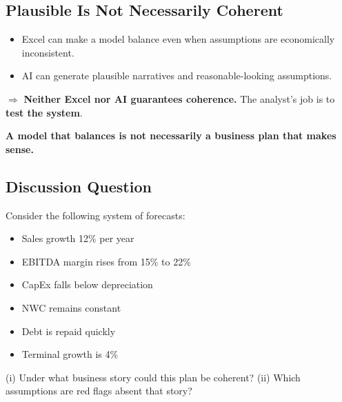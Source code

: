 \subsection{Plausible Is Not Necessarily Coherent}

\begin{itemize}
  \item Excel can make a model balance even when assumptions are economically inconsistent.
  \item AI can generate plausible narratives and reasonable-looking assumptions.
\end{itemize}
$\Longrightarrow$ \textbf{Neither Excel nor AI guarantees coherence.} The analyst's job is to \textbf{test the system}.
\begin{keybox}
\textbf{A model that balances is not necessarily a business plan that makes sense.}
\end{keybox}

\subsection[Discussion Question]{Discussion Question }

\begin{exbox}
Consider the following system of forecasts:
\begin{itemize}
  \item Sales growth 12\% per year
  \item EBITDA margin rises from 15\% to 22\%
  \item CapEx falls below depreciation
  \item NWC remains constant
  \item Debt is repaid quickly
  \item Terminal growth is 4\%
\end{itemize}
(i) Under what business story could this plan be coherent? (ii) Which assumptions are red flags absent that story?
\end{exbox}

